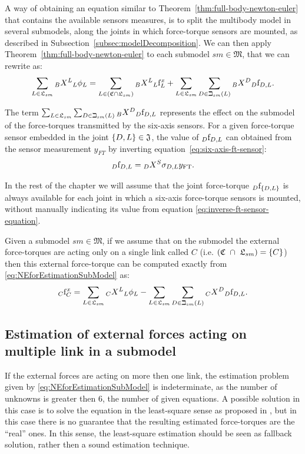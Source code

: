 A way of obtaining an equation similar to Theorem~\ref{thm:full-body-newton-euler}  that contains the available sensors measures, is to split the multibody model in several submodels, along the joints in which force-torque sensors are mounted, as described in Subsection~\ref{subsec:modelDecomposition}. We can then apply Theorem~\ref{thm:full-body-newton-euler} to each submodel $sm \in \mathfrak{M}$, that we can rewrite as:
\begin{equation}
    \label{eq:NEforEstimationSubModel}
    \sum_{L \in \mathfrak{L}_{sm}}  \hspace{0em}_B X^L \hspace{0em}_L \phi_L = \sum_{L \in (\mathfrak{C} \cap \mathfrak{L}_{sm}) }  \hspace{0em}_B X^L \hspace{0em}_L {\rm f}^x_L +  \sum_{L \in \mathfrak{L}_{sm}} \sum_{D \in \beth_{sm}(L)}  \hspace{0em}_B X^D \hspace{0em}_D {\rm f}_{D,L} .
\end{equation}

The term $\sum_{L \in \mathfrak{L}_{sm}} \sum_{D \in \beth_{sm}(L)}  \hspace{0em}_B X^D \hspace{0em}_D {\rm f}_{D,L}$ represents the effect on the submodel of the force-torques transmitted by the six-axis sensors. For a given force-torque sensor embedded in the joint $\{D,L\} \in \mathfrak{J}$, the value of $\hspace{0em}_D {\rm f}_{D,L}$ can obtained from the sensor measurement $y_{FT}$ by inverting equation~\eqref{eq:six-axis-ft-sensor}:
\begin{equation}
\label{eq:inverse-ft-sensor-equation}
\hspace{0em}_D {\rm f}_{D,L} = \hspace{0em}_D X^S \sigma_{D,L} y_{\text{FT}}.
\end{equation}

In the rest of the chapter we will assume that the joint force-torque $\hspace{0em}_D {\rm f}_{\{D,L\}}$ is always available for each joint in which a six-axis force-torque sensors is mounted, without manually indicating its value from equation \eqref{eq:inverse-ft-sensor-equation}.

Given a submodel $sm \in \mathfrak{M}$, if we assume that on the submodel the external force-torques are acting only on a single link called $C$ (i.e. $(\mathfrak{C}~\cap~\mathfrak{L}_{sm}) = \{C\}$) then this external force-torque can be computed exactly from \eqref{eq:NEforEstimationSubModel} as:
\begin{equation}
   \hspace{0em}_{C} {\rm f}^x_{C} =
   \sum_{L \in \mathfrak{L}_{sm}}  \hspace{0em}_C X^L \hspace{0em}_L \phi_L   -  \sum_{L \in \mathfrak{L}_{sm}} \sum_{D \in \beth_{sm}(L)}  \hspace{0em}_C X^D \hspace{0em}_D {\rm f}_{D,L} .
\end{equation}

\subsection{Estimation of external forces acting on multiple link in a submodel}
If the external forces are acting on more then one link, the estimation problem given by \eqref{eq:NEforEstimationSubModel} is indeterminate, as the number of unknowns is greater then 6, the number of given equations. A possible solution in this case is to solve the equation in the least-square sense as proposed in \cite{DelPrete2012}, but in this case there is no guarantee that the resulting estimated force-torques are the ``real'' ones. In this sense, the least-square estimation should be seen as fallback solution, rather then a sound estimation technique. 

